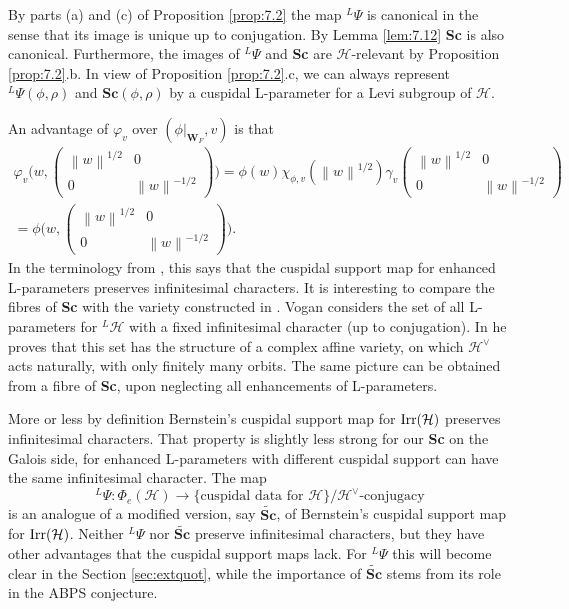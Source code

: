 \documentclass[11pt]{amsart}
\theoremstyle{definition}
\providecommand{\norm}[1]{\left\| #1 \right\|}
\newcommand{\mb}{\mathbf}
\newcommand{\matje}[4]{\left(\begin{smallmatrix} #1 & #2 \\ 
#3 & #4 \end{smallmatrix}\right)}
\def\Irr{{\rm Irr}}
\def\cH{{\mathcal H}}
\begin{document}
By parts (a) and (c) of Proposition \ref{prop:7.2} the map ${}^L \Psi$ is canonical in the 
sense that its image is unique up to conjugation. By Lemma \ref{lem:7.12} {\bf Sc} is
also canonical. Furthermore, the images of ${}^L \Psi$ and {\bf Sc} are $\cH$-relevant by 
Proposition \ref{prop:7.2}.b. In view of Proposition \ref{prop:7.2}.c, we can always
represent ${}^L \Psi (\phi,\rho)$ and $\mathbf{Sc}(\phi,\rho)$ by a cuspidal L-parameter
for a Levi subgroup of $\cH$.

An advantage of $\varphi_v$ over $(\phi|_{\mb W_F},v)$ is that
\begin{equation}\label{eq:infChar}
\begin{split}
\varphi_v \big( w, \matje{\norm{w}^{1/2}}{0}{0}{\norm{w}^{-1/2}} \big) = 
\phi (w) \chi_{\phi,v}(\norm{w}^{1/2}) \gamma_v \matje{\norm{w}^{1/2}}{0}{0}{\norm{w}^{-1/2}} \\
= \phi \big( w, \matje{\norm{w}^{1/2}}{0}{0}{\norm{w}^{-1/2}} \big) .
\end{split}
\end{equation}
In the terminology from \cite{Hai,Vog}, this says that the cuspidal support map for 
enhanced L-parameters preserves infinitesimal characters. It is interesting to
compare the fibres of {\bf Sc} with the variety constructed in \cite[Corollary 4.6]{Vog}.
Vogan considers the set of all L-parameters for ${}^L \cH$ with a fixed infinitesimal
character (up to conjugation). In \cite[Proposition 4.5]{Vog} he proves that this set has 
the structure of a complex affine variety, on which $\cH^\vee$ acts naturally, with only 
finitely many orbits. The same picture can be obtained from a fibre of {\bf Sc}, upon
neglecting all enhancements of L-parameters.

More or less by definition Bernstein's cuspidal support map for $\Irr (\cH)$ preserves
infinitesimal characters. That property is slightly less strong for our {\bf Sc} on the 
Galois side, for enhanced L-parameters with different cuspidal support can have the same 
infinitesimal character. The map 
\[
{}^L \Psi : \Phi_e (\cH) \to \{\text{cuspidal data for } \cH \} / \cH^\vee \text{-conjugacy} 
\]
is an analogue of a modified version, say $\widetilde{\mb{Sc}}$, of Bernstein's
cuspidal support map for $\Irr (\cH)$. Neither ${}^L \Psi$ nor 
$\widetilde{\mathbf{Sc}}$ preserve infinitesimal characters, but they
have other advantages that the cuspidal support maps lack. For ${}^L \Psi$
this will become clear in the Section \ref{sec:extquot}, while the importance 
of $\widetilde{\mathbf{Sc}}$ stems from its role in the ABPS conjecture. 
\end{document}
